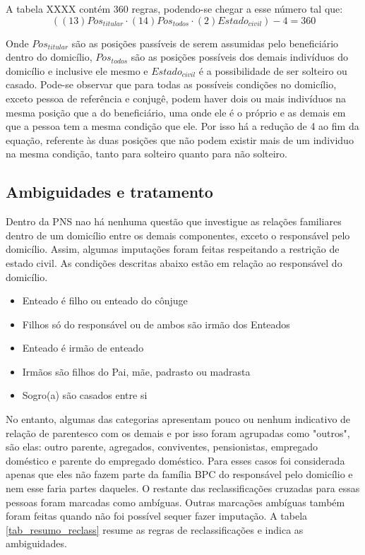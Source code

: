 \documentclass[
	12pt,				%
	openright,			%
	twoside,			%
	a4paper,			%
	english,			%
	french,				%
	spanish,			%
	brazil				%
	]{abntex2}
\begin{document}
	A tabela XXXX contém 360 regras, podendo-se chegar a esse número tal que:
	\begin{equation}
	((13)Pos_{titular} \cdot  (14)Pos_{todos}  \cdot (2)Estado_{civil} )-4 = 360
	\end{equation}
	
	Onde $ Pos_{titular} $ são as posições passíveis de serem assumidas pelo beneficiário dentro do domicílio, $ Pos_{todos} $ são as posições possíveis dos demais indivíduos do domicílio e inclusive ele mesmo e $ Estado_{civil}  $ é a possibilidade de ser solteiro ou casado. Pode-se observar que para todas as possíveis condições no domicílio, exceto pessoa de referência e conjugê, podem haver dois ou mais indivíduos na mesma posição que a do beneficiário, uma onde ele é o próprio e as demais em que a pessoa tem a mesma condição que ele. Por isso há a redução de 4 ao fim da equação, referente às duas posições que não podem existir mais de um individuo na mesma condição, tanto para solteiro quanto para não solteiro.
	
	\subsection{Ambiguidades e tratamento}
	Dentro da PNS nao há nenhuma questão que investigue as relações familiares dentro de um domicílio entre os demais componentes, exceto o responsável pelo domicílio. Assim, algumas imputações foram feitas respeitando a restrição de estado civil. As condições descritas abaixo estão em relação ao responsável do domicílio.
		\begin{itemize}
			\item Enteado é filho ou enteado do cônjuge
			\item Filhos só do responsável ou de ambos são irmão dos Enteados
			\item Enteado é irmão de enteado
			\item Irmãos são filhos do Pai, mãe, padrasto ou madrasta
			\item Sogro(a) são casados entre si
		\end{itemize}
	No entanto, algumas das categorias apresentam pouco ou nenhum indicativo de relação de parentesco com os demais e por isso foram agrupadas como "outros", são elas: outro parente, agregados, conviventes, pensionistas, empregado doméstico e parente do empregado doméstico. Para esses casos foi considerada apenas que eles não fazem parte da família BPC do responsável pelo domicílio e nem esse faria partes daqueles. O restante das reclassificações cruzadas para essas pessoas foram marcadas como ambíguas. Outras marcações ambíguas também foram feitas quando não foi possível sequer fazer imputação. A tabela \ref*{tab_resumo_reclass} resume as regras de reclassificações e indica as ambiguidades. 
	
\end{document}
